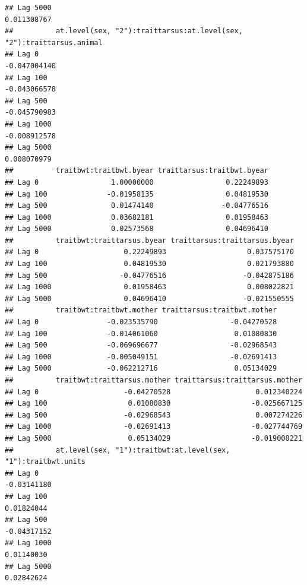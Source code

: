 \documentclass[
  12pt,
]{book}
\begin{document}
\begin{verbatim}
## Lag 5000                                                       0.011308767
##          at.level(sex, "2"):traittarsus:at.level(sex, "2"):traittarsus.animal
## Lag 0                                                            -0.047004140
## Lag 100                                                          -0.043066578
## Lag 500                                                          -0.045790983
## Lag 1000                                                         -0.008912578
## Lag 5000                                                          0.008070979
##          traitbwt:traitbwt.byear traittarsus:traitbwt.byear
## Lag 0                 1.00000000                 0.22249893
## Lag 100              -0.01958135                 0.04819530
## Lag 500               0.01474140                -0.04776516
## Lag 1000              0.03682181                 0.01958463
## Lag 5000              0.02573568                 0.04696410
##          traitbwt:traittarsus.byear traittarsus:traittarsus.byear
## Lag 0                    0.22249893                   0.037575170
## Lag 100                  0.04819530                   0.021793880
## Lag 500                 -0.04776516                  -0.042875186
## Lag 1000                 0.01958463                   0.008022821
## Lag 5000                 0.04696410                  -0.021550555
##          traitbwt:traitbwt.mother traittarsus:traitbwt.mother
## Lag 0                -0.023535790                 -0.04270528
## Lag 100              -0.014061060                  0.01080830
## Lag 500              -0.069696677                 -0.02968543
## Lag 1000             -0.005049151                 -0.02691413
## Lag 5000             -0.062212716                  0.05134029
##          traitbwt:traittarsus.mother traittarsus:traittarsus.mother
## Lag 0                    -0.04270528                    0.012340224
## Lag 100                   0.01080830                   -0.025667125
## Lag 500                  -0.02968543                    0.007274226
## Lag 1000                 -0.02691413                   -0.027744769
## Lag 5000                  0.05134029                   -0.019008221
##          at.level(sex, "1"):traitbwt:at.level(sex, "1"):traitbwt.units
## Lag 0                                                      -0.03141180
## Lag 100                                                     0.01824044
## Lag 500                                                    -0.04317152
## Lag 1000                                                    0.01140030
## Lag 5000                                                    0.02842624

\end{verbatim}
\end{document}
